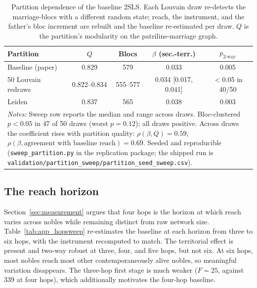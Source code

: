 \documentclass[12pt]{article}
\theoremstyle{definition}
\theoremstyle{remark}
\begin{document}
\begin{table}[t]
\centering
\caption{Partition dependence of the baseline 2SLS. Each Louvain draw
re-detects the marriage-blocs with a different random state; reach, the
instrument, and the father's bloc increment are rebuilt and the baseline
re-estimated per draw. $Q$ is the partition's modularity on the
patriline-marriage graph.}
\label{tab:app_partition}
\begin{tabular}{lcccc}
\toprule
Partition & $Q$ & Blocs & $\beta$ (sec.-terr.) & $p_{\text{2-way}}$ \\
\midrule
Baseline (paper) & 0.829 & 579 & 0.033 & 0.005 \\
50 Louvain redraws & 0.822--0.834 & 555--577 & 0.034 [0.017, 0.041] & $<$0.05 in 40/50 \\
Leiden & 0.837 & 565 & 0.038 & 0.003 \\
\midrule
\multicolumn{5}{p{0.85\textwidth}}{\footnotesize \textit{Notes:} Sweep row
reports the median and range across draws. Bloc-clustered $p < 0.05$ in
47 of 50 draws (worst $p = 0.12$); all draws positive. Across draws the
coefficient rises with partition quality: $\rho(\beta, Q) = 0.59$,
$\rho(\beta, \text{agreement with baseline reach}) = 0.69$. Seeded and
reproducible (\texttt{sweep\_partition.py} in the replication package;
the shipped run is
\texttt{validation/partition\_sweep/partition\_seed\_sweep.csv}).} \\
\bottomrule
\end{tabular}
\end{table}


\subsection{The reach horizon}

Section~\ref{sec:measurement} argues that four hops is the horizon at which reach varies across nobles while remaining distinct from raw network size. Table~\ref{tab:app_hopsweep} re-estimates the baseline at each horizon from three to six hops, with the instrument recomputed to match. The territorial effect is present and two-way robust at three, four, and five hops, but not six. At six hops, most nobles reach most other contemporaneously alive nobles, so meaningful variation disappears. The three-hop first stage is much weaker ($F=25$, against $339$ at four hops), which additionally motivates the four-hop baseline.
\end{document}
